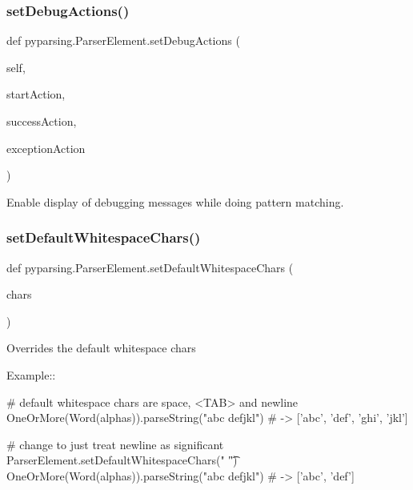 \subsubsection{\texorpdfstring{set\+Debug\+Actions()}{setDebugActions()}}
{\footnotesize\ttfamily def pyparsing.\+Parser\+Element.\+set\+Debug\+Actions (\begin{DoxyParamCaption}\item[{}]{self,  }\item[{}]{start\+Action,  }\item[{}]{success\+Action,  }\item[{}]{exception\+Action }\end{DoxyParamCaption})}

\begin{DoxyVerb}Enable display of debugging messages while doing pattern matching.
\end{DoxyVerb}
 \mbox{\label{classpyparsing_1_1ParserElement_a638b41abeb01b5133d30c1ba1fc075d8}} 
\subsubsection{\texorpdfstring{set\+Default\+Whitespace\+Chars()}{setDefaultWhitespaceChars()}}
{\footnotesize\ttfamily def pyparsing.\+Parser\+Element.\+set\+Default\+Whitespace\+Chars (\begin{DoxyParamCaption}\item[{}]{chars }\end{DoxyParamCaption})\hspace{0.3cm}{\ttfamily [static]}}

\begin{DoxyVerb}Overrides the default whitespace chars

Example::

    # default whitespace chars are space, <TAB> and newline
    OneOrMore(Word(alphas)).parseString("abc def\nghi jkl")  # -> ['abc', 'def', 'ghi', 'jkl']

    # change to just treat newline as significant
    ParserElement.setDefaultWhitespaceChars(" \t")
    OneOrMore(Word(alphas)).parseString("abc def\nghi jkl")  # -> ['abc', 'def']
\end{DoxyVerb}
 \mbox{\label{classpyparsing_1_1ParserElement_a38989383d034cbd8b3723141d1c43ffd}} 
